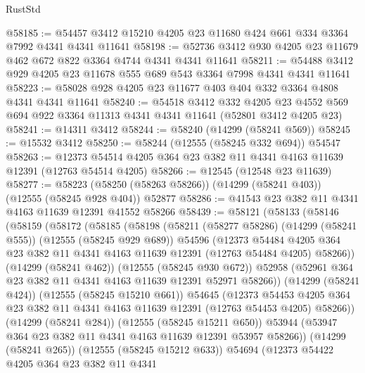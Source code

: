\begin{lexlean}{RustStd}
\begin{coremodule}
@58185 := @54457 @3412 @15210 @4205 @23 @11680 @424 @661 @334 @3364 @7992 @4341 @4341 @11641
@58198 := @52736 @3412 @930 @4205 @23 @11679 @462 @672 @822 @3364 @4744 @4341 @4341 @11641
@58211 := @54488 @3412 @929 @4205 @23 @11678 @555 @689 @543 @3364 @7998 @4341 @4341 @11641
@58223 := @58028 @928 @4205 @23 @11677 @403 @404 @332 @3364 @4808 @4341 @4341 @11641
@58240 := @54518
    @3412
    @332
    @4205
    @23
    @4552
    @569
    @694
    @922
    @3364
    @11313
    @4341
    @4341
    @11641
    (@52801 @3412 @4205 @23)
@58241 := @14311 @3412
@58244 := @58240 (@14299 (@58241 @569))
@58245 := @15532 @3412
@58250 := @58244 (@12555 (@58245 @332 @694)) @54547
@58263 := @12373 @54514 @4205 @364 @23 @382 @11 @4341 @4163 @11639 @12391 (@12763 @54514 @4205)
@58266 := @12545 (@12548 @23 @11639)
@58277 := @58223 (@58250 (@58263 @58266)) (@14299 (@58241 @403)) (@12555 (@58245 @928 @404)) @52877
@58286 := @41543 @23 @382 @11 @4341 @4163 @11639 @12391 @41552 @58266
@58439 := @58121
    (@58133
      (@58146
        (@58159
          (@58172
            (@58185
              (@58198
                (@58211
                  (@58277 @58286)
                  (@14299 (@58241 @555))
                  (@12555 (@58245 @929 @689))
                  @54596
                  (@12373
                    @54484
                    @4205
                    @364
                    @23
                    @382
                    @11
                    @4341
                    @4163
                    @11639
                    @12391
                    (@12763 @54484 @4205)
                    @58266))
                (@14299 (@58241 @462))
                (@12555 (@58245 @930 @672))
                @52958
                (@52961 @364 @23 @382 @11 @4341 @4163 @11639 @12391 @52971 @58266))
              (@14299 (@58241 @424))
              (@12555 (@58245 @15210 @661))
              @54645
              (@12373
                @54453
                @4205
                @364
                @23
                @382
                @11
                @4341
                @4163
                @11639
                @12391
                (@12763 @54453 @4205)
                @58266))
            (@14299 (@58241 @284))
            (@12555 (@58245 @15211 @650))
            @53944
            (@53947 @364 @23 @382 @11 @4341 @4163 @11639 @12391 @53957 @58266))
          (@14299 (@58241 @265))
          (@12555 (@58245 @15212 @633))
          @54694
          (@12373
            @54422
            @4205
            @364
            @23
            @382
            @11
            @4341

\end{coremodule}
\end{lexlean}
